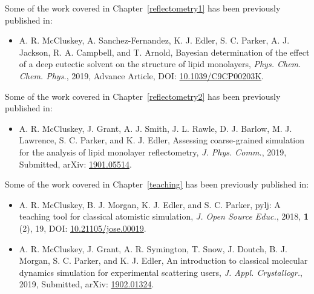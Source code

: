 \documentclass[
11pt, %
chapterinoneline,%
english, %
onehalfspacing
liststotoc, %
parskip, %
headsepline, %
]{reports/MastersDoctoralThesis} %
\begin{document}
\begin{pubsstatement}
\addchaptertocentry{\pubsname} %

Some of the work covered in Chapter~\ref{reflectometry1} has been previously published in:
\begin{itemize}
  \item A. R. McCluskey, A. Sanchez-Fernandez, K. J. Edler, S. C. Parker, A. J. Jackson, R. A. Campbell, and T. Arnold, Bayesian determination of the effect of a deep eutectic solvent on the structure of lipid monolayers, \emph{Phys. Chem. Chem. Phys.}, 2019, Advance Article, DOI: \href{https://doi.org/10.1039/C9CP00203K}{10.1039/C9CP00203K}.
\end{itemize}
Some of the work covered in Chapter~\ref{reflectometry2} has been previously published in:
\begin{itemize}
  \item A. R. McCluskey, J. Grant, A. J. Smith, J. L. Rawle, D. J. Barlow, M. J. Lawrence, S. C. Parker, and K. J. Edler, Assessing coarse-grained simulation for the analysis of lipid monolayer reflectometry, \emph{J. Phys. Comm.}, 2019, Submitted, arXiv: \href{https://arxiv.org/abs/1901.05514}{1901.05514}.
\end{itemize}
Some of the work covered in Chapter~\ref{teaching} has been previously published in:
\begin{itemize}
  \item A. R. McCluskey, B. J. Morgan, K. J. Edler, and S. C. Parker, pylj: A teaching tool for classical atomistic simulation, \emph{J. Open Source Educ.}, 2018, \textbf{1} (2), 19, DOI: \href{https://doi.org/10.21105/jose.00019}{10.21105/jose.00019}.
  \item A. R. McCluskey, J. Grant, A. R. Symington, T. Snow, J. Doutch, B. J. Morgan, S. C. Parker, and K. J. Edler, An introduction to classical molecular dynamics simulation for experimental scattering users, \emph{J. Appl. Crystallogr.}, 2019, Submitted, arXiv: \href{https://arxiv.org/abs/1902.01324}{1902.01324}.
\end{itemize}
\end{pubsstatement}


\tableofcontents %
\end{document}
